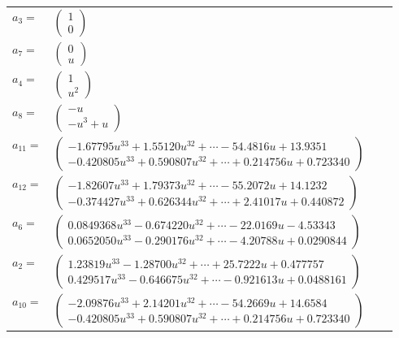 \documentclass[1p]{elsarticle_modified}
\theoremstyle{definition}
\begin{document}
\begin{tabular}{m{7pt} m{180pt} m{7pt} m{180pt} }
\flushright $a_{3}=$&$\begin{pmatrix}1\\0\end{pmatrix}$ \\
\flushright $a_{7}=$&$\begin{pmatrix}0\\u\end{pmatrix}$ \\
\flushright $a_{4}=$&$\begin{pmatrix}1\\u^2\end{pmatrix}$ \\
\flushright $a_{8}=$&$\begin{pmatrix}- u\\- u^3+u\end{pmatrix}$ \\
\flushright $a_{11}=$&$\begin{pmatrix}-1.67795 u^{33}+1.55120 u^{32}+\cdots-54.4816 u+13.9351\\-0.420805 u^{33}+0.590807 u^{32}+\cdots+0.214756 u+0.723340\end{pmatrix}$ \\
\flushright $a_{12}=$&$\begin{pmatrix}-1.82607 u^{33}+1.79373 u^{32}+\cdots-55.2072 u+14.1232\\-0.374427 u^{33}+0.626344 u^{32}+\cdots+2.41017 u+0.440872\end{pmatrix}$ \\
\flushright $a_{6}=$&$\begin{pmatrix}0.0849368 u^{33}-0.674220 u^{32}+\cdots-22.0169 u-4.53343\\0.0652050 u^{33}-0.290176 u^{32}+\cdots-4.20788 u+0.0290844\end{pmatrix}$ \\
\flushright $a_{2}=$&$\begin{pmatrix}1.23819 u^{33}-1.28700 u^{32}+\cdots+25.7222 u+0.477757\\0.429517 u^{33}-0.646675 u^{32}+\cdots-0.921613 u+0.0488161\end{pmatrix}$ \\
\flushright $a_{10}=$&$\begin{pmatrix}-2.09876 u^{33}+2.14201 u^{32}+\cdots-54.2669 u+14.6584\\-0.420805 u^{33}+0.590807 u^{32}+\cdots+0.214756 u+0.723340\end{pmatrix}$ \\

\end{tabular}
\end{document}
